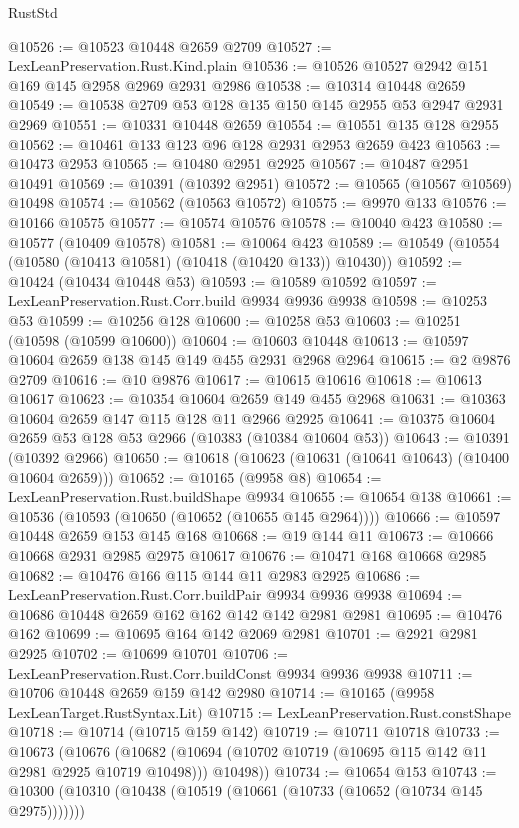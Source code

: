 \begin{lexlean}{RustStd}
\begin{coremodule}
@10526 := @10523 @10448 @2659 @2709
@10527 := LexLeanPreservation.Rust.Kind.plain
@10536 := @10526 @10527 @2942 @151 @169 @145 @2958 @2969 @2931 @2986
@10538 := @10314 @10448 @2659
@10549 := @10538 @2709 @53 @128 @135 @150 @145 @2955 @53 @2947 @2931 @2969
@10551 := @10331 @10448 @2659
@10554 := @10551 @135 @128 @2955
@10562 := @10461 @133 @123 @96 @128 @2931 @2953 @2659 @423
@10563 := @10473 @2953
@10565 := @10480 @2951 @2925
@10567 := @10487 @2951 @10491
@10569 := @10391 (@10392 @2951)
@10572 := @10565 (@10567 @10569) @10498
@10574 := @10562 (@10563 @10572)
@10575 := @9970 @133
@10576 := @10166 @10575
@10577 := @10574 @10576
@10578 := @10040 @423
@10580 := @10577 (@10409 @10578)
@10581 := @10064 @423
@10589 := @10549 (@10554 (@10580 (@10413 @10581) (@10418 (@10420 @133)) @10430))
@10592 := @10424 (@10434 @10448 @53)
@10593 := @10589 @10592
@10597 := LexLeanPreservation.Rust.Corr.build @9934 @9936 @9938
@10598 := @10253 @53
@10599 := @10256 @128
@10600 := @10258 @53
@10603 := @10251 (@10598 (@10599 @10600))
@10604 := @10603 @10448
@10613 := @10597 @10604 @2659 @138 @145 @149 @455 @2931 @2968 @2964
@10615 := @2 @9876 @2709
@10616 := @10 @9876
@10617 := @10615 @10616
@10618 := @10613 @10617
@10623 := @10354 @10604 @2659 @149 @455 @2968
@10631 := @10363 @10604 @2659 @147 @115 @128 @11 @2966 @2925
@10641 := @10375 @10604 @2659 @53 @128 @53 @2966 (@10383 (@10384 @10604 @53))
@10643 := @10391 (@10392 @2966)
@10650 := @10618 (@10623 (@10631 (@10641 @10643) (@10400 @10604 @2659)))
@10652 := @10165 (@9958 @8)
@10654 := LexLeanPreservation.Rust.buildShape @9934
@10655 := @10654 @138
@10661 := @10536 (@10593 (@10650 (@10652 (@10655 @145 @2964))))
@10666 := @10597 @10448 @2659 @153 @145 @168
@10668 := @19 @144 @11
@10673 := @10666 @10668 @2931 @2985 @2975 @10617
@10676 := @10471 @168 @10668 @2985
@10682 := @10476 @166 @115 @144 @11 @2983 @2925
@10686 := LexLeanPreservation.Rust.Corr.buildPair @9934 @9936 @9938
@10694 := @10686 @10448 @2659 @162 @162 @142 @142 @2981 @2981
@10695 := @10476 @162
@10699 := @10695 @164 @142 @2069 @2981
@10701 := @2921 @2981 @2925
@10702 := @10699 @10701
@10706 := LexLeanPreservation.Rust.Corr.buildConst @9934 @9936 @9938
@10711 := @10706 @10448 @2659 @159 @142 @2980
@10714 := @10165 (@9958 LexLeanTarget.RustSyntax.Lit)
@10715 := LexLeanPreservation.Rust.constShape
@10718 := @10714 (@10715 @159 @142)
@10719 := @10711 @10718
@10733 := @10673
    (@10676
      (@10682 (@10694 (@10702 @10719 (@10695 @115 @142 @11 @2981 @2925 @10719 @10498))) @10498))
@10734 := @10654 @153
@10743 := @10300 (@10310 (@10438 (@10519 (@10661 (@10733 (@10652 (@10734 @145 @2975)))))))

\end{coremodule}
\end{lexlean}
